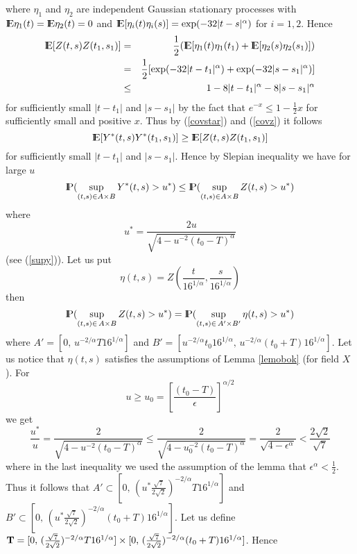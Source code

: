 where $\eta_1$ and $\eta_2$ are independent Gaussian stationary processes with
${\rm I\hspace{-0.8mm}E}\eta_1(t)={\rm I\hspace{-0.8mm}E}\eta_2(t)=0$ and ${\rm I\hspace{-0.8mm}E}[\eta_i(t)\eta_i(s)]=\exp(-32|t-s|^\alpha)$ for
$i=1,2$. Hence
\begin{eqnarray}
{\rm I\hspace{-0.8mm}E}[Z(t,s)Z(t_1,s_1)]&=&\frac{1}{2}({\rm I\hspace{-0.8mm}E}[\eta_1(t)\eta_1(t_1)+{\rm I\hspace{-0.8mm}E}[\eta_2(s)\eta_2(s_1)])\nonumber\\
&=& \frac{1}{2}[\exp(-32|t-t_1|^\alpha)+\exp(-32|s-s_1|^\alpha)]\nonumber\\
&\leq& 1-8|t-t_1|^\alpha-8|s-s_1|^{\alpha}\label{covz}
\end{eqnarray} 
for sufficiently small $|t-t_1|$ and $|s-s_1|$ by the fact that $e^{-x}\leq 1-\frac{1}{2}x$ for sufficiently small and positive $x$.
Thus by (\ref{covstar}) and (\ref{covz}) it follows
\begin{equation}\label{ineqcov}
{\rm I\hspace{-0.8mm}E}[Y^{*}(t,s)Y^{*}(t_1,s_1)]\geq {\rm I\hspace{-0.8mm}E}[Z(t,s)Z(t_1,s_1)]
\end{equation}
for sufficiently small $|t-t_1|$ and $|s-s_1|$. Hence by Slepian inequality we have for large $u$
\begin{equation}\label{supineq}
{\rm I\hspace{-0.8mm}P}(\sup_{(t,s)\in A\times B}Y^{*}(t,s)>u^{*})\leq {\rm I\hspace{-0.8mm}P}(\sup_{(t,s)\in A\times B}Z(t,s)>u^{*})
\end{equation}
where 
$$
u^{*}=\frac{2u}{\sqrt{4-u^{-2}(t_0-T)^\alpha}}
$$ 
(see (\ref{supy})).
Let us put
$$
\eta(t,s)=Z\left(\frac{t}{16^{1/\alpha}},\frac{s}{16^{1/\alpha}}\right)
$$
then
\begin{equation}\label{zeteta}
{\rm I\hspace{-0.8mm}P}(\sup_{(t,s)\in\,A\times B} Z(t,s)>u^{*})
= {\rm I\hspace{-0.8mm}P}(\sup_{(t,s)\in\,A'\times B'} \eta(t,s)>u^{*})
\end{equation}
where $A'=[0,\,u^{-2/\alpha}T 16^{1/\alpha}]$ and $B'=[u^{-2/\alpha}t_0 16^{1/\alpha},\,u^{-2/\alpha}(t_0+T)16^{1/\alpha}]$.
Let us notice that $\eta(t,s)$ satisfies the assumptions of Lemma \ref{lemobok} (for field $X$).
For 
$$
u\geq u_0=\left[\frac{(t_0-T)}{\epsilon}\right]^{\alpha/2}
$$
we get
$$
\frac{u^{*}}{u}=\frac{2}{\sqrt{4-u^{-2}(t_0-T)^\alpha}}
\leq  \frac{2}{\sqrt{4-u_0^{-2}(t_0-T)^\alpha}}
= \frac{2}{\sqrt{4-\epsilon^\alpha}}
<  \frac{2\sqrt{2}}{\sqrt{7}}
$$
where in the last inequality we used the assumption of the lemma that $\epsilon^\alpha<\frac{1}{2}$.
Thus it follows that $A'\subset[0,\,(u^{*}\frac{\sqrt{7}}{2\sqrt{2}})^{-2/\alpha}T 16^{1/\alpha}]$ and
$B'\subset [0,\,(u^{*}\frac{\sqrt{7}}{2\sqrt{2}})^{-2/\alpha}(t_0+T)16^{1/\alpha}]$. Let us define
${\bf T}=[0,\,(\frac{\sqrt{7}}{2\sqrt{2}})^{-2/\alpha}T 16^{1/\alpha}]\times [0,\,(\frac{\sqrt{7}}{2\sqrt{2}})^{-2/\alpha}(t_0+T)16^{1/\alpha}]$. Hence
